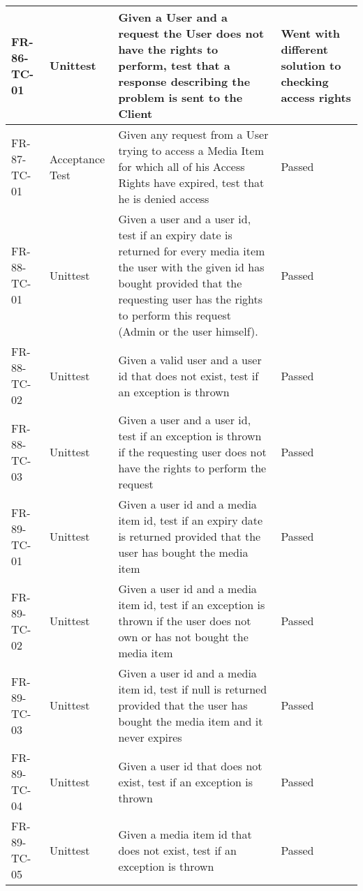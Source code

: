 \documentclass[../report.tex]{subfiles}
\begin{document}
\begin{longtable}{|L{2.1cm}|L{3cm}|C{7.5cm}|L{3cm}|}
FR-86-TC-01&Unittest&Given a User and a request the User does not have the rights to perform, test that a response describing the problem is sent to the Client&Went with different solution to checking access rights  \\ \hline
FR-87-TC-01&Acceptance Test&Given any request from a User trying to access a Media Item for which all of his Access Rights have expired, test that he is denied access&Passed  \\ \hline
FR-88-TC-01&Unittest&Given a user and a user id, test if an expiry date is returned for every media item the user with the given id has bought provided that the requesting user has the rights to perform this request (Admin or the user himself).&Passed  \\ \hline
FR-88-TC-02&Unittest&Given a valid user and a user id that does not exist, test if an exception is thrown&Passed  \\ \hline
FR-88-TC-03&Unittest&Given a user and a user id, test if an exception is thrown if the requesting user does not have the rights to perform the request&Passed  \\ \hline
FR-89-TC-01&Unittest&Given a user id and a media item id, test if an expiry date is returned provided that the user has bought the media item&Passed  \\ \hline
FR-89-TC-02&Unittest&Given a user id and a media item id, test if an exception is thrown if the user does not own or has not bought the media item&Passed  \\ \hline
FR-89-TC-03&Unittest&Given a user id and a media item id, test if null is returned provided that the user has bought the media item and it never expires&Passed  \\ \hline
FR-89-TC-04&Unittest&Given a user id that does not exist, test if an exception is thrown&Passed  \\ \hline
FR-89-TC-05&Unittest&Given a media item id that does not exist, test if an exception is thrown&Passed  \\ \hline
\end{longtable}
\end{document}
